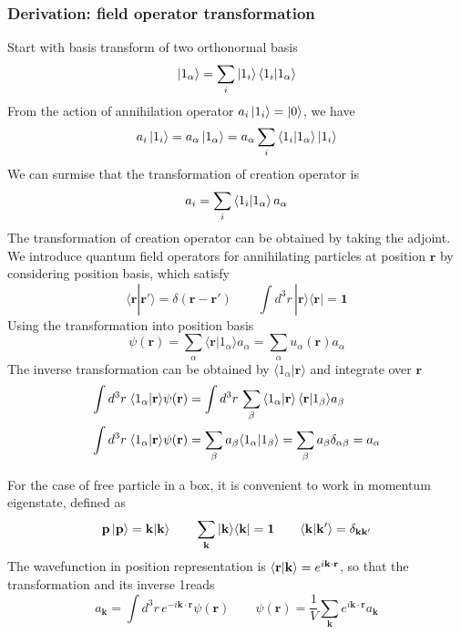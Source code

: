 \documentclass[../../../main.tex]{subfiles}
\begin{document}
\subsubsection{Derivation: field operator transformation}
Start with basis transform of two orthonormal basis
\begin{equation*}
  \ket{1_\alpha} = \sum_{i} \ket{1_i  }\braket{1_i  | 1_\alpha}
\end{equation*}
From the action of annihilation operator $a_i \ket{1_i}=\ket{0}$, we have
\begin{equation*}
  a_i \ket{1_i} = a_\alpha \ket{1_\alpha} = a_\alpha  \sum_{i} \braket{1_i | 1_\alpha } \ket{1_i}
\end{equation*}
We can surmise that the transformation of creation operator is
\begin{equation*}
  a_i = \sum_{i} \braket{1_i | 1_\alpha } a_\alpha
\end{equation*}
The transformation of creation operator can be obtained by taking the adjoint.
We introduce quantum field operators for annihilating particles at position $\mathbf{r}$ by considering position basis, which satisfy
\begin{equation*}
  \langle \mathbf{r} | \mathbf{r}' \rangle = \delta(\mathbf{r} - \mathbf{r}') \qquad
  \int d^3 r \, |\mathbf{r}\rangle \langle \mathbf{r}| = \mathbf{1}
\end{equation*}
Using the transformation into position basis
\begin{equation*}
  \psi(\mathbf{r})          = \sum_\alpha \langle \mathbf{r} | 1_\alpha \rangle a_\alpha = \sum_\alpha u_\alpha(\mathbf{r}) a_\alpha
\end{equation*}
The inverse transformation can be obtained by $\langle 1_\alpha | \mathbf{r} \rangle$ and integrate over $\mathbf{r}$
\begin{align*}
  \int d^3 r \; \langle 1_\alpha | \mathbf{r} \rangle \psi(\mathbf{r})
   & =  \int d^3 r \, \sum_\beta \braket{1_\alpha  | \mathbf{r}}\langle \mathbf{r} | 1_\beta \rangle  a_\beta \\
  \int d^3 r \; \langle 1_\alpha | \mathbf{r} \rangle \psi(\mathbf{r})
   & =  \sum_\beta a_\beta \langle 1_\alpha | 1_\beta \rangle
  = \sum_\beta a_\beta \delta_{\alpha \beta}
  = a_\alpha
\end{align*}

For the case of free particle in a box, it is convenient to work in momentum eigenstate, defined as
\begin{equation*}
  \mathbf{p } \ket{\mathbf{p }} = \mathbf{k } | \mathbf{k} \rangle\qquad
  \sum_{\mathbf{k}} | \mathbf{k} \rangle \langle \mathbf{k} | = \mathbf{1} \qquad
  \langle \mathbf{k} | \mathbf{k}' \rangle = \delta_{\mathbf{k}\mathbf{k}'}
\end{equation*}
The wavefunction in position representation is $\braket{\mathbf{r }|\mathbf{k }  } = e ^{i \mathbf{k }\cdot \mathbf{r}}$, so that the transformation and its inverse 1reads
\begin{equation*}
  a_\mathbf{k} = \int d^3 r \, e^{-i \mathbf{k} \cdot \mathbf{r}} \psi(\mathbf{r})\qquad
  \psi(\mathbf{r}) = \frac{1}{V} \sum_\mathbf{k} e^{i \mathbf{k} \cdot \mathbf{r}} a_\mathbf{k}
\end{equation*}
\end{document}

